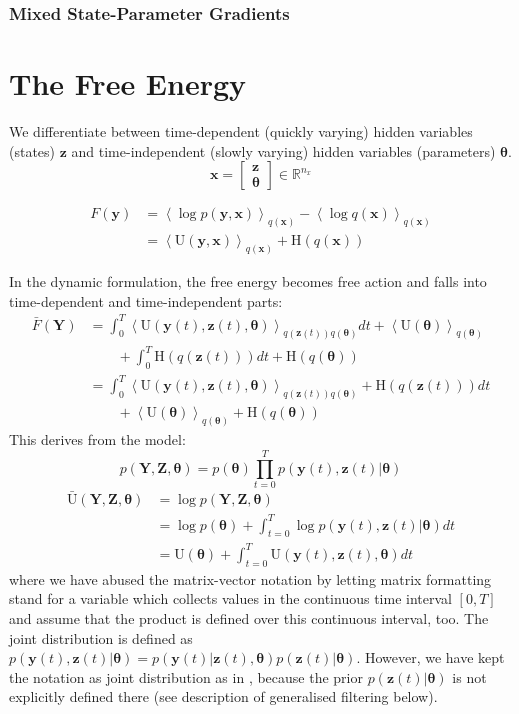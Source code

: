 \documentclass[a4paper,10pt]{article}
\newcommand{\bs}[1]{\mathbf{#1}}					%
\newcommand{\bgs}[1]{\boldsymbol{#1}}				%
\newcommand{\eq}[1]{\begin{equation} #1 \end{equation}}%
\renewcommand{\ss}{z}         %
\newcommand{\so}{y}         %
\newcommand{\sh}{x}         %
\renewcommand{\sp}{\theta}    %
\newcommand{\ps}{\bs{\ss}}    %
\newcommand{\po}{\bs{\so}}    %
\newcommand{\ph}{\bs{\sh}}    %
\newcommand{\pp}{\bgs{\sp}} %
\newcommand{\Ps}{\bs{Z}}    %
\newcommand{\Po}{\bs{Y}}    %
\newcommand{\E}[2][]{\left\langle #2 \right\rangle_{#1}}	%
\newcommand{\Ent}{\mathrm{H}}			%
\newcommand{\U}{\mathrm{U}}			%
\newcommand{\Ua}{\bar{\mathrm{U}}}		%
\newcommand{\R}{\mathbb{R}}				%
\begin{document}
\subsubsection{Mixed State-Parameter Gradients}




\section{The Free Energy}
We differentiate between time-dependent (quickly varying) hidden variables (states) $\ps$ and time-independent (slowly varying) hidden variables (parameters) $\pp$.
\eq{
    \ph = \left[\begin{array}{c}
            \ps\\
            \pp
          \end{array}\right] \in \R^{n_\sh}
}

\eq{\begin{split}
    F(\po) &= \E[q(\ph)]{\log p(\po,\ph)} - \E[q(\ph)]{\log q(\ph)}\\
               &= \E[q(\ph)]{\U(\po,\ph)} + \Ent(q(\ph))
\end{split}}

In the dynamic formulation, the free energy becomes free action and falls into time-dependent and time-independent parts:
\eq{\begin{split}\label{eq:freeAction}
    \bar{F}(\Po) &= \int_0^T \E[q(\ps(t))q(\pp)]{\U(\po(t),\ps(t),\pp)}dt + \E[q(\pp)]{\U(\pp)}\\ 
    & \qquad + \int_0^T\Ent(q(\ps(t)))dt + \Ent(q(\pp))\\
    &= \int_0^T \E[q(\ps(t))q(\pp)]{\U(\po(t),\ps(t),\pp)} + \Ent(q(\ps(t))) dt\\
    & \qquad  + \E[q(\pp)]{\U(\pp)} + \Ent(q(\pp))
\end{split}}
This derives from the model:
\eq{
    p(\Po,\Ps,\pp) = p(\pp)\prod_{t=0}^T p(\po(t),\ps(t)|\pp)
}
\eq{\begin{split}\label{eq:intAction}
    \Ua(\Po,\Ps,\pp) &= \log p(\Po,\Ps,\pp)\\
    &= \log p(\pp) + \int_{t=0}^T \log p(\po(t),\ps(t)|\pp)dt\\
    &= \U(\pp) + \int_{t=0}^T \U(\po(t),\ps(t),\pp)dt
\end{split}}
where we have abused the matrix-vector notation by letting matrix formatting stand for a variable which collects values in the continuous time interval $[0,T]$ and assume that the product is defined over this continuous interval, too. The joint distribution is defined as $p(\po(t),\ps(t)|\pp) = p(\po(t)|\ps(t),\pp)p(\ps(t)|\pp)$. However, we have kept the notation as joint distribution as in \citep{Friston2008a}, because the prior $p(\ps(t)|\pp)$ is not explicitly defined there (see description of generalised filtering below). 
\end{document}
